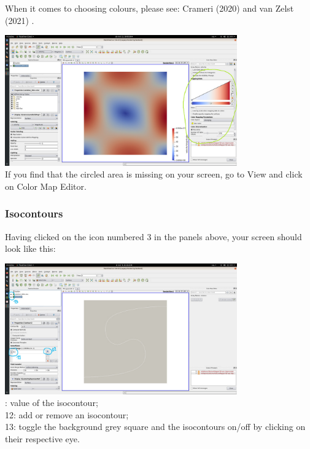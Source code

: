 When it comes to choosing colours, please see: 
Crameri \etal (2020) \cite{crsh20} and van Zelst \etal (2021) \cite{vacp21}.


\begin{center}
\includegraphics[width=10cm]{images/paraview/p11}\\
{\captionfont If you find that the circled area is missing on your screen, 
go to View and click on Color Map Editor.}
\end{center}


\subsubsection*{Isocontours}

Having clicked on the icon numbered 3 in the panels above, 
your screen should look like this:

\begin{center}
\includegraphics[width=10cm]{images/paraview/p7}\\
{: value of the isocontour; \\
12: add or remove an isocontour;\\
13: toggle the background grey square and the isocontours on/off by clicking on their respective eye.}
\end{center}


